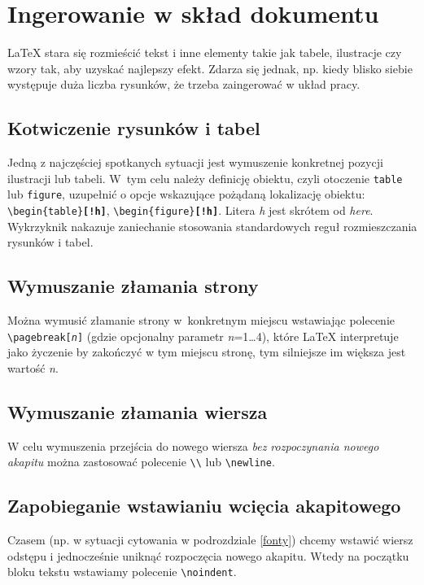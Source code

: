 \section{Ingerowanie w skład dokumentu}
{\LaTeX} stara się rozmieścić tekst i inne elementy takie jak tabele, ilustracje czy wzory tak, aby uzyskać najlepszy efekt. Zdarza się jednak, np. kiedy blisko siebie występuje  duża liczba rysunków, że trzeba zaingerować  w układ pracy. 
\subsection{Kotwiczenie rysunków i tabel}
Jedną z najczęściej spotkanych sytuacji jest wymuszenie konkretnej pozycji ilustracji lub tabeli. W~tym celu należy definicję obiektu, czyli otoczenie \texttt{table} lub \texttt{figure}, uzupełnić o opcje wskazujące pożądaną lokalizację obiektu: \texttt{\textbackslash begin\{table\}\textbf{[!h]}},	\texttt{\textbackslash begin\{figure\}\textbf{[!h]}}. Litera \textit{h} jest skrótem od \textit{here}. Wykrzyknik nakazuje zaniechanie stosowania standardowych reguł rozmieszczania rysunków i tabel.

\subsection{Wymuszanie złamania strony}
Można wymusić złamanie strony w~konkretnym miejscu wstawiając polecenie  \texttt{\textbackslash pagebreak[\textit{n}]} (gdzie opcjonalny parametr \textit{n}=1\dots 4), które  {\LaTeX} interpretuje jako życzenie by zakończyć w tym miejscu stronę, tym silniejsze im większa jest wartość \textit{n}. 

\subsection{Wymuszanie złamania wiersza}
W celu wymuszenia przejścia do nowego wiersza \textit{bez rozpoczynania nowego akapitu} można zastosować polecenie \texttt{\textbackslash\textbackslash} lub \texttt{\textbackslash newline}.

\subsection{Zapobieganie wstawianiu wcięcia akapitowego}
Czasem (np. w sytuacji cytowania w podrozdziale \ref{fonty}) chcemy wstawić wiersz odstępu i jednocześnie uniknąć rozpoczęcia nowego akapitu. Wtedy na początku bloku tekstu wstawiamy polecenie \texttt{\textbackslash noindent}.


